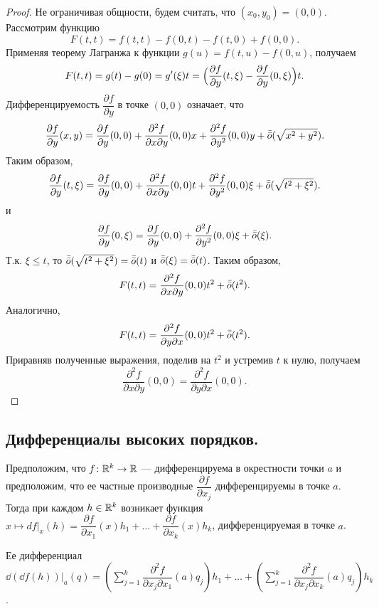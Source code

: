 \documentclass[a4paper]{article}
\theoremstyle{named}
\begin{document}
    \begin{proof}
        Не ограничивая общности, будем считать, что $(x_0,y_0)=(0,0)$.
        Рассмотрим функцию
        $$
        F(t,t) = f(t,t) - f(0,t) - f(t,0) + f(0,0).
        $$
        Применяя теорему Лагранжа к функции $g(u)= f(t,u)-f(0,u)$,
        получаем
        $$
        F(t,t) = g(t) - g(0) = g'(\xi)t = \Bigl(\dfrac{\partial f}{\partial y}(t,\xi) -  \dfrac{\partial f}{\partial y}(0,\xi)\Bigr)t.
        $$
        Дифференцируемость $\dfrac{\partial f}{\partial y}$ в точке $(0,0)$ означает, что
        $$
        \dfrac{\partial f}{\partial y}(x,y) = \dfrac{\partial f}{\partial y}(0,0) +
        \dfrac{\partial^2 f}{\partial x\partial y}(0,0)x + \dfrac{\partial^2 f}{\partial y^2}(0,0)y + \bar{\bar{o}}(\sqrt{x^2+y^2}).
        $$
        Таким образом,
        $$
        \dfrac{\partial f}{\partial y}(t,\xi) = \dfrac{\partial f}{\partial y}(0,0) +
        \dfrac{\partial^2 f}{\partial x\partial y}(0,0)t + \dfrac{\partial^2 f}{\partial y^2}(0,0)\xi + \bar{\bar{o}}(\sqrt{t^2+\xi^2}).
        $$
        и
        $$
        \dfrac{\partial f}{\partial y}(0,\xi) = \dfrac{\partial f}{\partial y}(0,0) +
        \dfrac{\partial^2 f}{\partial y^2}(0,0)\xi + \bar{\bar{o}}(\xi).
        $$
        Т.к. $\xi\leq t$, то $\bar{\bar{o}}(\sqrt{t^2+\xi^2}) = \bar{\bar{o}}(t)$ и $\bar{\bar{o}}(\xi) = \bar{\bar{o}}(t)$.
        Таким образом,
        $$
        F(t,t) = \dfrac{\partial^2 f}{\partial x\partial y}(0,0)t^2 + \bar{\bar{o}}(t^2).
        $$
        Аналогично,
        $$
        F(t,t) = \dfrac{\partial^2 f}{\partial y\partial x}(0,0)t^2 + \bar{\bar{o}}(t^2).
        $$
        Приравняв полученные выражения, поделив на $t^2$ и устремив $t$ к нулю, получаем
        $$
        \dfrac{\partial^2 f}{\partial x\partial y}(0,0) = \dfrac{\partial^2 f}{\partial y\partial x}(0,0).
        $$
    \end{proof}

    \subsection{Дифференциалы высоких порядков.}

    Предположим, что $f\colon \mathbb{R}^k\to \mathbb{R}$ --- дифференцируема в окрестности точки $a$ и предположим, что ее частные производные
    $\dfrac{\partial f}{\partial x_j}$ дифференцируемы в точке $a$.
    Тогда при каждом $h\in \mathbb{R}^k$ возникает функция $x\mapsto df\bigl|_x(h)=\dfrac{\partial f}{\partial x_1}(x)h_1+\ldots+\dfrac{\partial f}{\partial x_k}(x)h_k$, дифференцируемая в точке $a$.
    
    Ее дифференциал
    $\dd(\dd f(h))\bigl|_a (q)=
    \left(\sum\limits_{j=1}^{k}\dfrac{\partial^2 f}{\partial x_j\partial x_1}(a)q_j\right)h_1+\ldots+
    \left(\sum\limits_{j=1}^{k}\dfrac{\partial^2 f}{\partial x_j\partial x_k}(a)q_j\right)h_k$.
\end{document}
